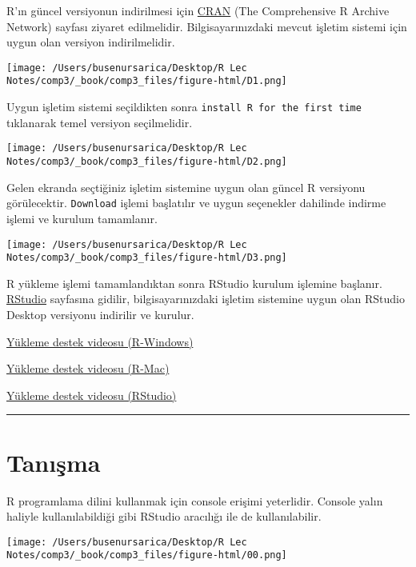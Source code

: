 \documentclass[
]{book}
\begin{document}
R'ın güncel versiyonun indirilmesi için \href{http://www.cran.r-project.org}{CRAN} (The Comprehensive R Archive Network) sayfası ziyaret edilmelidir. Bilgisayarınızdaki mevcut işletim sistemi için uygun olan versiyon indirilmelidir.

\texttt{[image: /Users/busenursarica/Desktop/R Lec Notes/comp3/\_book/comp3\_files/figure-html/D1.png]}

Uygun işletim sistemi seçildikten sonra \texttt{install\ R\ for\ the\ first\ time} tıklanarak temel versiyon seçilmelidir.

\texttt{[image: /Users/busenursarica/Desktop/R Lec Notes/comp3/\_book/comp3\_files/figure-html/D2.png]}

Gelen ekranda seçtiğiniz işletim sistemine uygun olan güncel R versiyonu görülecektir. \texttt{Download} işlemi başlatılır ve uygun seçenekler dahilinde indirme işlemi ve kurulum tamamlanır.

\texttt{[image: /Users/busenursarica/Desktop/R Lec Notes/comp3/\_book/comp3\_files/figure-html/D3.png]}

R yükleme işlemi tamamlandıktan sonra RStudio kurulum işlemine başlanır. \href{https://rstudio.com/products/rstudio/download/}{RStudio} sayfasına gidilir, bilgisayarınızdaki işletim sistemine uygun olan RStudio Desktop versiyonu indirilir ve kurulur.

\href{https://www.youtube.com/watch?v=Ohnk9hcxf9M\&feature=youtu.be}{Yükleme destek videosu (R-Windows)}

\href{https://www.youtube.com/watch?v=uxuuWXU-7UQ\&feature=youtu.be}{Yükleme destek videosu (R-Mac)}

\href{https://www.youtube.com/watch?v=bM7Sfz-LADM\&feature=youtu.be}{Yükleme destek videosu (RStudio)}

\begin{center}\rule{0.5\linewidth}{0.5pt}\end{center}

\hypertarget{tanux131ux15fma}{%
\section{Tanışma}\label{tanux131ux15fma}}

R programlama dilini kullanmak için console erişimi yeterlidir. Console yalın haliyle kullanılabildiği gibi RStudio aracılığı ile de kullanılabilir.

\texttt{[image: /Users/busenursarica/Desktop/R Lec Notes/comp3/\_book/comp3\_files/figure-html/00.png]}
\end{document}
